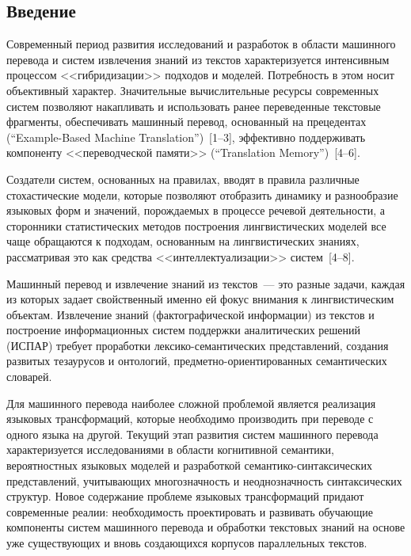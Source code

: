 \begin{multicols}{2}

\section{Введение}

Современный период развития исследований и разработок в области
машинного перевода и сис\-тем извлечения знаний из текстов характеризуется
интенсивным процессом <<гибридизации>> подходов и моделей.
Потребность в этом носит объективный характер. Значительные
вычислительные ресурсы современных систем позволяют накапливать и
использовать ранее переведенные текстовые фрагменты, обеспечивать
машинный перевод, основанный на прецедентах (``Example-Based Machine
Translation'')~[1--3], эффективно поддерживать
компоненту <<переводческой памяти>>
(``Translation Memory'')~[4--6].

\label{st\stat}

\thispagestyle{headings}

Создатели систем, основанных на правилах, вводят в правила различные
стохастические модели, которые позволяют отобразить динамику и разнообразие 
языковых форм и значений, по\-рож\-да\-емых в процессе речевой деятельности, а 
сторонники статистических методов построения лингвистических моделей все чаще 
обращаются к подходам, основанным на лингвистических знаниях, 
рас\-смат\-ри\-вая это как средства <<интеллектуализации>> систем~[4--8].

Машинный перевод и извлечение знаний из текстов~--- это разные задачи, каждая 
из которых задает свойственный именно ей фокус внимания к лингвистическим 
объектам. Извлечение знаний (фактографической информации) из текстов и 
построение информационных систем поддержки аналитических решений (ИСПАР) 
требует проработки лексико-семантических представлений, создания развитых 
тезаурусов и онтологий, пред\-мет\-но-ори\-ен\-ти\-ро\-ван\-ных семантических 
словарей.

Для машинного перевода наиболее сложной проблемой является
реализация языковых трансформаций, которые необходимо производить при
переводе с одного языка на другой. Текущий этап развития систем
машинного перевода характеризуется исследованиями в области
когнитивной семантики, вероятностных языковых моделей и разработкой
семантико-синтаксических пред\-став\-ле\-ний, учитывающих многозначность и
неоднозначность синтаксических структур. Новое содержание проблеме
языковых трансформаций придают современные реалии: необходимость
проектировать и развивать обучающие компоненты систем машинного
перевода и обработки текстовых знаний на основе уже существующих и
вновь со\-зда\-ющих\-ся корпусов параллельных текстов.


\end{multicols}
